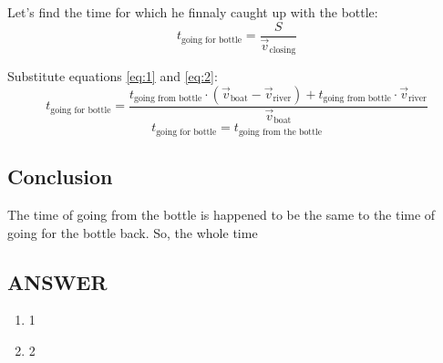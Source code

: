 Let's find the time for which he finnaly caught up with the bottle:
\begin{equation}
    \label{eq:3}
    t_{\text{going for bottle}} = \frac{S}{\Vec{v}_\text{closing}}
\end{equation}

Substitute equations \eqref{eq:1} and \eqref{eq:2}:
$$t_{\text{going for bottle}} = \frac{t_{\text{going from bottle}} \cdot (\Vec{v}_{\text{boat}} - \Vec{v}_{\text{river}}) + t_{\text{going from bottle}} \cdot \Vec{v}_{\text{river}}}{\Vec{v}_{\text{boat}}}$$ 
$$ t_{\text{going for bottle}} = t_\text{going from the bottle} $$

\subsection*{Conclusion}
The time of going from the bottle is happened to be the same to the time of going for the bottle back.
So, the whole time 



\vfill
\subsection*{ANSWER}
\begin{enumerate}
    \item 1
    \item 2
\end{enumerate}

